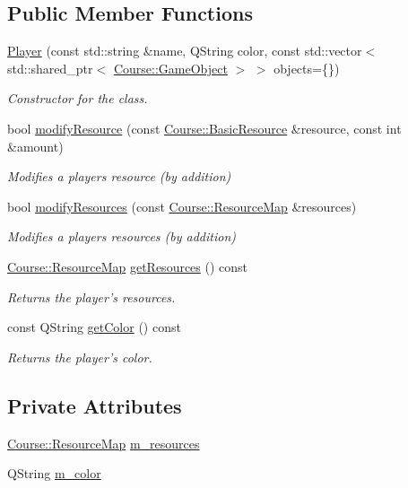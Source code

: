 \subsection*{Public Member Functions}
\begin{DoxyCompactItemize}
\item 
\hyperlink{classGame_1_1Player_a1550c6bbc0e31a91847fd1bfa61ebbd5}{Player} (const std\-::string \&name, Q\-String color, const std\-::vector$<$ std\-::shared\-\_\-ptr$<$ \hyperlink{classCourse_1_1GameObject}{Course\-::\-Game\-Object} $>$ $>$ objects=\{\})
\begin{DoxyCompactList}\small\item\em Constructor for the class. \end{DoxyCompactList}\item 
bool \hyperlink{classGame_1_1Player_aec9c6bb5b0ee04271f84a99d90663d7f}{modify\-Resource} (const \hyperlink{namespaceCourse_a02d49c04029594d4adba79b84bb85f65}{Course\-::\-Basic\-Resource} \&resource, const int \&amount)
\begin{DoxyCompactList}\small\item\em Modifies a players resource (by addition) \end{DoxyCompactList}\item 
bool \hyperlink{classGame_1_1Player_a68980b4a5e45acca17bfeb6674031526}{modify\-Resources} (const \hyperlink{namespaceCourse_ab9a46ed9cd00485e318e5731ea2f78d9}{Course\-::\-Resource\-Map} \&resources)
\begin{DoxyCompactList}\small\item\em Modifies a players resources (by addition) \end{DoxyCompactList}\item 
\hyperlink{namespaceCourse_ab9a46ed9cd00485e318e5731ea2f78d9}{Course\-::\-Resource\-Map} \hyperlink{classGame_1_1Player_a3614aac3989870a566469c9df26f8a19}{get\-Resources} () const 
\begin{DoxyCompactList}\small\item\em Returns the player's resources. \end{DoxyCompactList}\item 
const Q\-String \hyperlink{classGame_1_1Player_a60dafb9daab8ce844f69cc0d78dabd5a}{get\-Color} () const 
\begin{DoxyCompactList}\small\item\em Returns the player's color. \end{DoxyCompactList}\end{DoxyCompactItemize}
\subsection*{Private Attributes}
\begin{DoxyCompactItemize}
\item 
\hyperlink{namespaceCourse_ab9a46ed9cd00485e318e5731ea2f78d9}{Course\-::\-Resource\-Map} \hyperlink{classGame_1_1Player_a78e032ef0212488e590267e4bd101400}{m\-\_\-resources}
\item 
Q\-String \hyperlink{classGame_1_1Player_aba8134395ff2502baa9dddbd4ebea5ad}{m\-\_\-color}
\end{DoxyCompactItemize}


